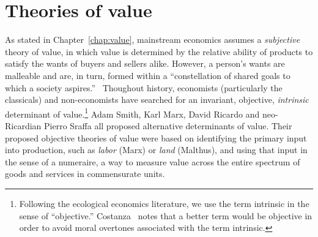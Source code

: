 % 
% 
% 


\section{Theories of value}
\label{sec:theory_of_value}

As stated in Chapter~\ref{chap:value}, mainstream economics assumes a
\emph{subjective} theory of value, 
in which value is determined by the relative ability 
of products to satisfy the wants of buyers and sellers alike.
However, a person’s wants are malleable and are, in turn, formed within a 
``constellation of shared goals to which a society aspires.''~\cite{Costanza:2004we}
Thoughout history, economists (particularly the classicals) 
and non-economists have searched for an invariant, objective, 
\emph{intrinsic} determinant of value.\footnote{Following the ecological economics literature, 
	we use the term intrinsic in the sense of ``objective.'' Costanza~\cite{Costanza:2004we} 
notes that a better term would be objective in order to avoid moral overtones associated 
with the term intrinsic.} 
Adam Smith, Karl Marx, David Ricardo and neo-Ricardian Pierro Sraffa all proposed 
alternative determinants of value.  
Their proposed objective theories of value were based 
on identifying the primary input into production,
such as \emph{labor} (Marx) or \emph{land} (Malthus), 
and using that input in the sense of a numeraire, 
a way to measure value across the entire spectrum 
of goods and services in commensurate units.


